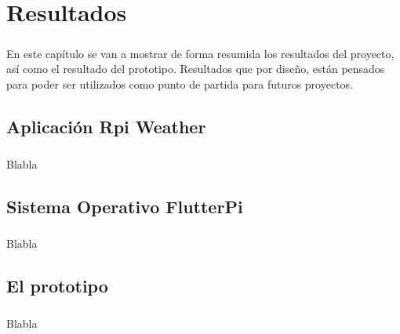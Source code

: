 \chapter{Resultados}\label{sec:resultados}

\paragraph{}En este capítulo se van a mostrar de forma resumida los resultados del proyecto,
así como el resultado del prototipo. Resultados que por diseño, están pensados para
poder ser utilizados como punto de partida para futuros proyectos.

\section{Aplicación Rpi Weather}\label{sec:rpiweather}

\paragraph{}Blabla

\section{Sistema Operativo FlutterPi}\label{sec:flutterpi}

\paragraph{}Blabla

\section{El prototipo}\label{sec:prototipo}

\paragraph{}Blabla
